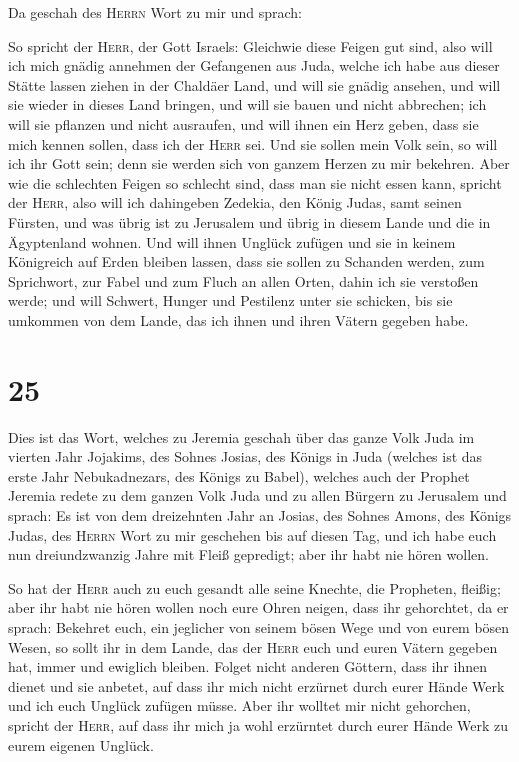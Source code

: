  Da geschah des \textsc{Herrn} Wort zu mir und sprach:

 So spricht der \textsc{Herr}, der Gott Israels: Gleichwie
diese Feigen gut sind, also will ich mich gnädig annehmen der Gefangenen
aus Juda, welche ich habe aus dieser Stätte lassen ziehen in der
Chaldäer Land,  und will sie gnädig ansehen, und will sie
wieder in dieses Land bringen, und will sie bauen und nicht abbrechen;
ich will sie pflanzen und nicht ausraufen,  und will ihnen
ein Herz geben, dass sie mich kennen sollen, dass ich der \textsc{Herr}
sei. Und sie sollen mein Volk sein, so will ich ihr Gott sein; denn sie
werden sich von ganzem Herzen zu mir bekehren.  Aber wie
die schlechten Feigen so schlecht sind, dass man sie nicht essen kann,
spricht der \textsc{Herr}, also will ich dahingeben Zedekia, den König
Judas, samt seinen Fürsten, und was übrig ist zu Jerusalem und übrig in
diesem Lande und die in Ägyptenland wohnen.  Und will
ihnen Unglück zufügen und sie in keinem Königreich auf Erden bleiben
lassen, dass sie sollen zu Schanden werden, zum Sprichwort, zur Fabel
und zum Fluch an allen Orten, dahin ich sie verstoßen werde;
 und will Schwert, Hunger und Pestilenz unter sie
schicken, bis sie umkommen von dem Lande, das ich ihnen und ihren Vätern
gegeben habe.

\hypertarget{section-24}{%
\section{25}\label{section-24}}

 Dies ist das Wort, welches zu Jeremia geschah über das
ganze Volk Juda im vierten Jahr Jojakims, des Sohnes Josias, des Königs
in Juda (welches ist das erste Jahr Nebukadnezars, des Königs zu Babel),
 welches auch der Prophet Jeremia redete zu dem ganzen
Volk Juda und zu allen Bürgern zu Jerusalem und sprach: 
Es ist von dem dreizehnten Jahr an Josias, des Sohnes Amons, des Königs
Judas, des \textsc{Herrn} Wort zu mir geschehen bis auf diesen Tag, und
ich habe euch nun dreiundzwanzig Jahre mit Fleiß gepredigt; aber ihr
habt nie hören wollen.

 So hat der \textsc{Herr} auch zu euch gesandt alle seine
Knechte, die Propheten, fleißig; aber ihr habt nie hören wollen noch
eure Ohren neigen, dass ihr gehorchtet,  da er sprach:
Bekehret euch, ein jeglicher von seinem bösen Wege und von eurem bösen
Wesen, so sollt ihr in dem Lande, das der \textsc{Herr} euch und euren
Vätern gegeben hat, immer und ewiglich bleiben.  Folget
nicht anderen Göttern, dass ihr ihnen dienet und sie anbetet, auf dass
ihr mich nicht erzürnet durch eurer Hände Werk und ich euch Unglück
zufügen müsse.  Aber ihr wolltet mir nicht gehorchen,
spricht der \textsc{Herr}, auf dass ihr mich ja wohl erzürntet durch
eurer Hände Werk zu eurem eigenen Unglück.

